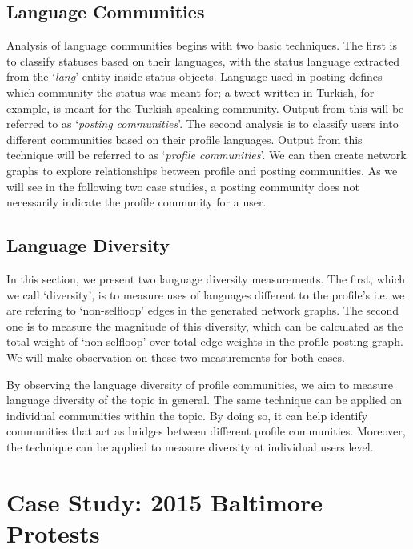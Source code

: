 \subsection{Language Communities}\label{langcomm}

Analysis of language communities begins with two basic techniques. The
first is to classify statuses based on their languages, with the
status language extracted from the `{\emph{lang}}' entity inside
status objects. Language used in posting defines which community the
status was meant for; a tweet written in Turkish, for example, is
meant for the Turkish-speaking community. Output from this will be
referred to as `{\emph{posting communities}}'. The second analysis is
to classify users into different communities based on their profile
languages. Output from this technique will be referred to as
`{\emph{profile communities}}'. We can then create network graphs to
explore relationships between profile and posting communities.  As we
will see in the following two case studies, a posting community does
not necessarily indicate the profile community for a user.

\subsection{Language Diversity}\label{diversity}

In this section, we present two language diversity measurements. The
first, which we call `diversity', is to measure uses of languages
different to the profile's i.e. we are refering to `non-selfloop'
edges in the generated network graphs. The second one is to measure
the magnitude of this diversity, which can be calculated as the total
weight of `non-selfloop' over total edge weights in the
profile-posting graph. We will make observation on these two
measurements for both cases.

By observing the language diversity of profile communities, we aim to
measure language diversity of the topic in general. The same technique
can be applied on individual communities within the topic. By doing
so, it can help identify communities that act as bridges between
different profile communities. Moreover, the technique can be applied
to measure diversity at individual users level.


\section{Case Study: 2015 Baltimore Protests}\label{baltimorecasestudy}

